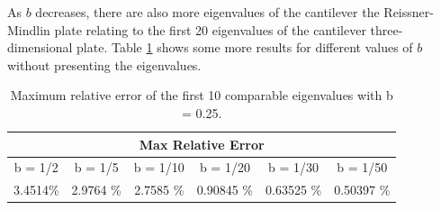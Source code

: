 \documentclass[../../main.tex]{subfiles}
\begin{document}
As $b$ decreases, there are also more eigenvalues of the cantilever the Reissner-Mindlin plate relating to the first 20 eigenvalues of the cantilever three-dimensional plate. Table
\ref{tab:Table_plate_1_1} shows some more results for different values of $b$ without presenting the eigenvalues.


\FloatBarrier
\begin{table}[htbp]
	\centering
	\caption{Maximum relative error of the first 10 comparable eigenvalues with b = 0.25.}
	\begin{tabular}{|c|c|c|c|c|c|}
		\hline
		\multicolumn{6}{|c|}{Max Relative Error } \\ 
		\hline 
		\hline
		b = 1/2 & b = 1/5 & b = 1/10 & b = 1/20 & b = 1/30 & b = 1/50\\ \hline
		3.4514\% & 2.9764 \% & 2.7585 \% & 0.90845 \% & 0.63525 \% & 0.50397 \% \\ \hline
	\end{tabular}%
	\label{tab:Table_plate_1_1}%
\end{table}%
\end{document}
